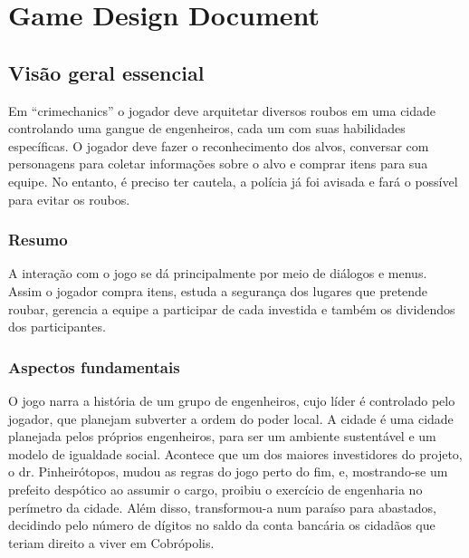 \chapter{Game Design Document}\label{ap:gdd}
\section{Visão geral essencial}

Em ``crimechanics'' o jogador deve arquitetar diversos roubos em uma cidade controlando uma gangue de engenheiros, cada um com suas habilidades específicas. O jogador deve fazer o reconhecimento dos alvos, conversar com personagens para coletar informações sobre o alvo e comprar itens para sua equipe. No entanto, é preciso ter cautela, a polícia já foi avisada e fará o possível para evitar os roubos.

\subsection{Resumo}

A interação com o jogo se dá principalmente  por meio de diálogos e menus. Assim o jogador compra itens, estuda a segurança dos lugares que pretende roubar, gerencia a equipe a participar de cada investida e também os dividendos dos participantes.

\subsection{Aspectos fundamentais}

\newcommand{\nomeCidade}{Cobrópolis}

O jogo narra a história de um grupo de engenheiros, cujo líder é controlado pelo jogador, que planejam subverter a ordem do poder local. A cidade é uma cidade planejada pelos próprios engenheiros, para ser um ambiente sustentável e um modelo de igualdade social. Acontece que um dos maiores investidores do projeto, o dr. Pinheirótopos, mudou as regras do jogo perto do fim, e, mostrando-se um prefeito despótico ao assumir o cargo, proibiu o exercício de engenharia no perímetro da cidade. Além disso, transformou-a num paraíso para abastados, decidindo pelo número de dígitos no saldo da conta bancária os cidadãos que teriam direito a viver em \nomeCidade.

